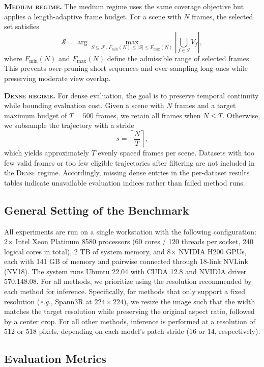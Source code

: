 \textbf{\textsc{Medium regime.}}
The medium regime uses the same coverage objective but applies a length-adaptive frame budget.
For a scene with $N$ frames, the selected set satisfies
\[
\mathcal{S}
=
\arg\max_{S \subseteq \mathcal{F},\, F_{\min}(N) \le |S| \le F_{\max}(N)}
\left|
\bigcup_{f \in S} V_f
\right|,
\]
where $F_{\min}(N)$ and $F_{\max}(N)$ define the admissible range of selected frames.
This prevents over-pruning short sequences and over-sampling long ones while preserving moderate view overlap.

\textbf{\textsc{Dense regime.}}
For dense evaluation, the goal is to preserve temporal continuity while bounding evaluation cost.
%
Given a scene with $N$ frames and a target maximum budget of $T=500$ frames, we retain all frames when $N \le T$.
Otherwise, we subsample the trajectory with a stride
\[
s = \left\lceil \frac{N}{T} \right\rceil,
\]
which yields approximately $T$ evenly spaced frames per scene.
Datasets with too few valid frames or too few eligible trajectories after filtering are not included in the \textsc{Dense} regime.
%
Accordingly, missing dense entries in the per-dataset results tables indicate unavailable evaluation indices rather than failed method runs.

\subsection{General Setting of the Benchmark}
All experiments are run on a single workstation with the following configuration: 2$\times$ Intel Xeon Platinum 8580 processors (60 cores / 120 threads per socket, 240 logical cores in total), 2 TB of system memory, and 8$\times$ NVIDIA H200 GPUs, each with 141 GB of memory and pairwise connected through 18-link NVLink (NV18). 
%
The system runs Ubuntu 22.04 with CUDA 12.8 and NVIDIA driver 570.148.08.
%
For all methods, we prioritize using the resolution recommended by each method for inference.
%
Specifically, for methods that only support a fixed resolution (\emph{e.g.}, Spann3R at $224 \times 224$), we resize the image such that the width matches the target resolution while preserving the original aspect ratio, followed by a center crop. For all other methods, inference is performed at a resolution of $512$ or $518$ pixels, depending on each model's patch stride ($16$ or $14$, respectively).



\subsection{Evaluation Metrics}
\label{appendix:metrics}

